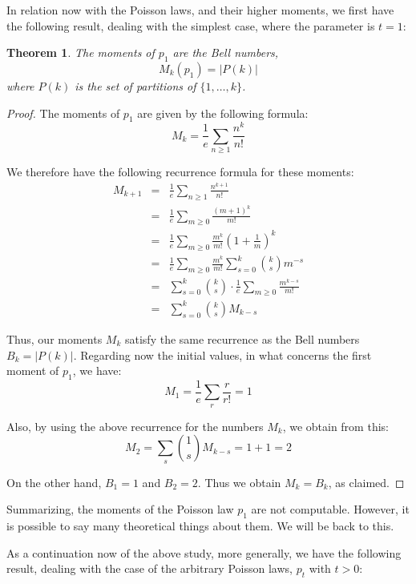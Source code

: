 \documentclass[12pt]{amsbook}
\newtheorem{theorem}{Theorem}[chapter]
\begin{document}
In relation now with the Poisson laws, and their higher moments, we first have the following result, dealing with the simplest case, where the parameter is $t=1$:


\begin{theorem}
The moments of $p_1$ are the Bell numbers,
$$M_k(p_1)=|P(k)|$$
where $P(k)$ is the set of partitions of $\{1,\ldots,k\}$.
\end{theorem}

\begin{proof}
The moments of $p_1$ are given by the following formula:
$$M_k=\frac{1}{e}\sum_{n\geq1}\frac{n^k}{n!}$$

We therefore have the following recurrence formula for these moments:
\begin{eqnarray*}
M_{k+1}
&=&\frac{1}{e}\sum_{n\geq1}\frac{n^{k+1}}{n!}\\
&=&\frac{1}{e}\sum_{m\geq0}\frac{(m+1)^k}{m!}\\
&=&\frac{1}{e}\sum_{m\geq0}\frac{m^k}{m!}\left(1+\frac{1}{m}\right)^k\\
&=&\frac{1}{e}\sum_{m\geq0}\frac{m^k}{m!}\sum_{s=0}^k\binom{k}{s}m^{-s}\\
&=&\sum_{s=0}^k\binom{k}{s}\cdot\frac{1}{e}\sum_{m\geq0}\frac{m^{k-s}}{m!}\\
&=&\sum_{s=0}^k\binom{k}{s}M_{k-s}
\end{eqnarray*}

Thus, our moments $M_k$ satisfy the same recurrence as the Bell numbers $B_k=|P(k)|$. Regarding now the initial values, in what concerns the first moment of $p_1$, we have:
$$M_1=\frac{1}{e}\sum_r\frac{r}{r!}=1$$

Also, by using the above recurrence for the numbers $M_k$, we obtain from this:
$$M_2
=\sum_s\binom{1}{s}M_{k-s}
=1+1
=2$$

On the other hand, $B_1=1$ and $B_2=2$. Thus we obtain $M_k=B_k$, as claimed.
\end{proof}

Summarizing, the moments of the Poisson law $p_1$ are not computable. However, it is possible to say many theoretical things about them. We will be back to this.

\bigskip

As a continuation now of the above study, more generally, we have the following result, dealing with the case of the arbitrary Poisson laws, $p_t$ with $t>0$:
\end{document}
